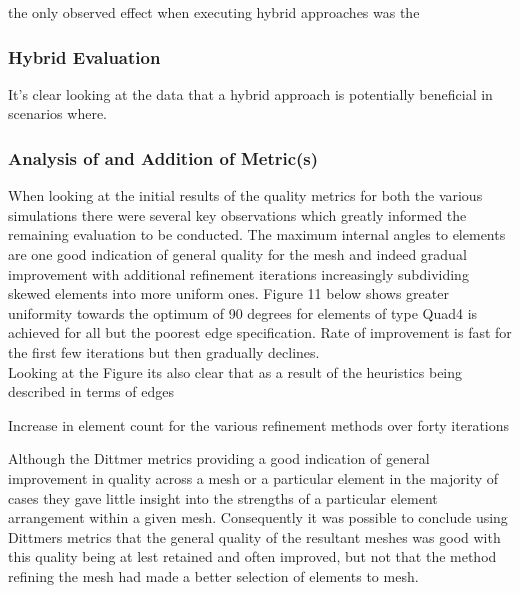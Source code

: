                                                                                                                                                       
                                                                                                                                                       
                                                                                                                                                        the only observed effect when executing hybrid approaches was the




\subsubsection{Hybrid Evaluation}
It's clear looking at the data that a hybrid approach is potentially beneficial in scenarios where.



\subsubsection{Analysis of and Addition of Metric(s)}
\noindent
When looking at the initial results of the quality metrics for both the various simulations there were several key observations which greatly informed the remaining evaluation to be conducted. The maximum internal angles to elements are one good indication of general quality for the mesh and indeed gradual improvement with additional refinement iterations increasingly subdividing skewed elements into more uniform ones. Figure 11 below shows greater uniformity towards the optimum of 90 degrees for elements of type Quad4 is achieved for all but the poorest edge specification. Rate of improvement is fast for the first few iterations but then gradually declines. \\ 

Looking at the Figure its also clear that as a result of the heuristics being described in terms of edges

Increase in element count for the various refinement methods over forty iterations

\noindent
Although the Dittmer metrics providing a good indication of general improvement in quality across a mesh or a particular element in the majority of cases they gave little insight into the strengths of a particular element arrangement within a given mesh. Consequently it was possible to conclude using Dittmers metrics that the general quality of the resultant meshes was good with this quality being at lest retained and often improved, but not that the method refining the mesh had made a better selection of elements to mesh. \\

